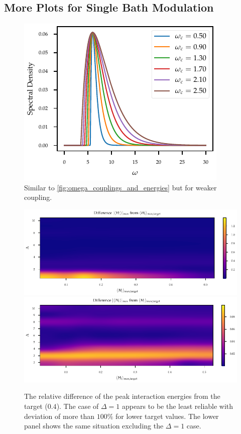 \subsection{More Plots for Single Bath Modulation}
\label{sec:extra_single_plots}
\begin{figure}[H]
  \centering
  \includegraphics{figs/one_bath_mod/omega_sd_weak}
  \caption{\label{fig:omega_couplings_weak} Similar
    to \cref{fig:omega_couplings_and_energies} but for weaker coupling.}
\end{figure}

\begin{figure}[H]
  \centering
  \includegraphics{figs/one_bath_mod/interaction_tuning_success}
  \includegraphics{figs/one_bath_mod/interaction_tuning_success_detail}
  \caption{\label{fig:interaction_tuning_success} The relative
    difference of the peak interaction energies from the target
    (\(0.4\)). The case of \(Δ=1\) appears to be the least reliable
    with deviation of more than \(100\%\) for lower target values. The
  lower panel shows the same situation excluding the \(Δ=1\) case.}
\end{figure}


